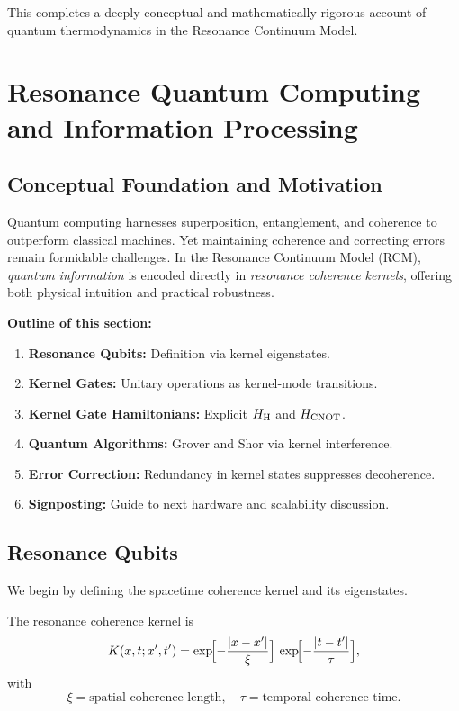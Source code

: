This completes a deeply conceptual and mathematically rigorous account of quantum thermodynamics in the Resonance Continuum Model.

\section{Resonance Quantum Computing and Information Processing}

\subsection{Conceptual Foundation and Motivation}

Quantum computing harnesses superposition, entanglement, and coherence to outperform classical machines. Yet maintaining coherence and correcting errors remain formidable challenges. In the Resonance Continuum Model (RCM), \emph{quantum information} is encoded directly in \emph{resonance coherence kernels}, offering both physical intuition and practical robustness.

\vspace{0.5em}
\noindent\textbf{Outline of this section:}
\begin{enumerate}
  \item \textbf{Resonance Qubits:} Definition via kernel eigenstates.
  \item \textbf{Kernel Gates:} Unitary operations as kernel‐mode transitions.
  \item \textbf{Kernel Gate Hamiltonians:} Explicit $H_{\rm H}$ and $H_{\rm CNOT}$.
  \item \textbf{Quantum Algorithms:} Grover and Shor via kernel interference.
  \item \textbf{Error Correction:} Redundancy in kernel states suppresses decoherence.
  \item \textbf{Signposting:} Guide to next hardware and scalability discussion.
\end{enumerate}

\subsection{Resonance Qubits}

We begin by defining the spacetime coherence kernel and its eigenstates.

\begin{definition}\label{def:kernel}
The resonance coherence kernel is
\begin{equation}\label{eq:kernel_def}
K(x,t; x',t')
= \exp\!\Bigl[-\frac{|x - x'|}{\xi}\Bigr]\,
  \exp\!\Bigl[-\frac{|t - t'|}{\tau}\Bigr],
\end{equation}
with 
\[
\xi = \text{spatial coherence length},\quad
\tau = \text{temporal coherence time}.
\]
\end{definition}

